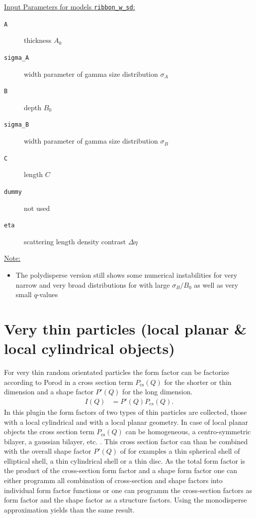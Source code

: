 \noindent \uline{Input Parameters for models \texttt{ribbon\_w\_sd}:}\\
\begin{description}
\item[\texttt{A}] thickness $A_0$
\item[\texttt{sigma\_A}] width parameter of gamma size distribution $\sigma_A$
\item[\texttt{B}] depth $B_0$
\item[\texttt{sigma\_B}] width parameter of gamma size distribution $\sigma_B$
\item[\texttt{C}] length $C$
\item[\texttt{dummy}] not used
\item[\texttt{eta}] scattering length density contrast $\Delta\eta$
\end{description}

\noindent\uline{Note:}
\begin{itemize}
\item The polydisperse version still shows some numerical instabilities for very narrow and very broad distributions for with large $\sigma_B/B_0$ as well as very small $q$-values
\end{itemize}

\clearpage
\section{Very thin particles (local planar \& local cylindrical objects)}
\label{sec:very_anisotropic_particles}
For very thin random orientated particles the form factor
can be factorize according to Porod \cite{Porod1948} in a cross
section term $P_\text{cs}(Q)$ for the shorter or thin dimension and a
shape factor $P'(Q)$ for the long dimension.
\begin{align}
\label{eq:PprimePcs}
I(Q) &=P'(Q) P_{cs}(Q).
\end{align}
In this plugin the form factors of two types of thin
particles are collected, those with a local cylindrical and with a
local planar geometry. In case of local planar objects the cross
section term $P_\text{cs}(Q)$ can be homogeneous, a
centro-symmetric bilayer, a gaussian bilayer, etc. . This cross
section factor can than be combined with the overall shape factor
$P'(Q)$ of for examples a thin spherical shell of elliptical
shell, a thin cylindrical shell or a thin disc. As the total form
factor is the product of the cross-section form factor and a shape
form factor one can either programm all combination of
cross-section and shape factors into individual form factor
functions or one can programm the cross-section factors as form
factor and the shape factor as a structure factors. Using the
monodisperse approximation yields than the same result.

